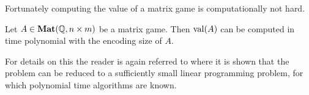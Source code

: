 Fortunately computing the value of a matrix game is computationally not hard.
\begin{prop}
  Let $A \in \mathbf{Mat}(\mathbb{Q}, n \times m)$ be a matrix game. Then 
  $\mathrm{val}(A)$ can be computed in time polynomial with the encoding size of $A$.
\end{prop}
For details on this the reader is again referred to \citep[Chapter 15]{matrixGamesChvatal} where
it is shown that the problem can be reduced to a sufficiently small linear programming problem,
for which polynomial time algorithms are known.
